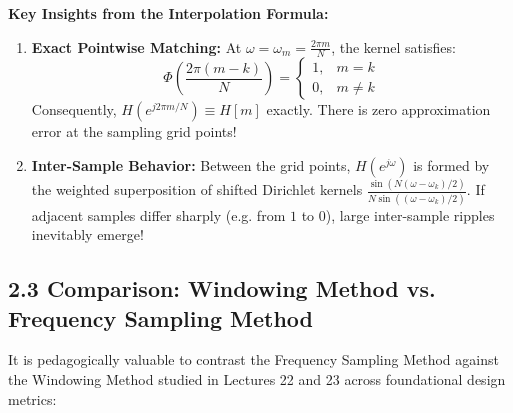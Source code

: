 \documentclass[11pt,a4paper]{article}
\begin{document}
\noindent\textbf{Key Insights from the Interpolation Formula:}
\begin{enumerate}
    \item \textbf{Exact Pointwise Matching:} At $\omega = \omega_m = \frac{2\pi m}{N}$, the kernel satisfies:
    \begin{equation}
    \Phi\left( \frac{2\pi (m - k)}{N} \right) = \begin{cases} 1, & m = k \\ 0, & m \ne k \end{cases}
    \end{equation}
    Consequently, $H(e^{j 2\pi m / N}) \equiv H[m]$ exactly. There is zero approximation error at the sampling grid points!
    \item \textbf{Inter-Sample Behavior:} Between the grid points, $H(e^{j\omega})$ is formed by the weighted superposition of shifted Dirichlet kernels $\frac{\sin(N(\omega - \omega_k)/2)}{N\sin((\omega - \omega_k)/2)}$. If adjacent samples differ sharply (e.g. from $1$ to $0$), large inter-sample ripples inevitably emerge!
\end{enumerate}

\subsection{2.3 Comparison: Windowing Method vs. Frequency Sampling Method}
It is pedagogically valuable to contrast the Frequency Sampling Method against the Windowing Method studied in Lectures 22 and 23 across foundational design metrics:
\end{document}
